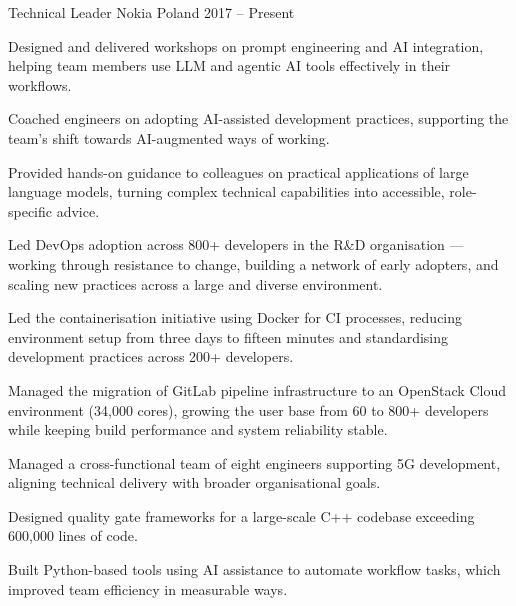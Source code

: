 
\begin{cventries}

  \cventry
    {Technical Leader} %
    {Nokia} %
    {Poland} %
    {2017 -- Present} %
    {
      \begin{cvitems}
        \item {Designed and delivered workshops on prompt engineering and AI integration, helping team members use LLM and agentic AI tools effectively in their workflows.}
        \item {Coached engineers on adopting AI-assisted development practices, supporting the team's shift towards AI-augmented ways of working.}
        \item {Provided hands-on guidance to colleagues on practical applications of large language models, turning complex technical capabilities into accessible, role-specific advice.}
      \end{cvitems}

      \begin{cvitems}
        \item {Led DevOps adoption across 800+ developers in the R&D organisation — working through resistance to change, building a network of early adopters, and scaling new practices across a large and diverse environment.}
        \item {Led the containerisation initiative using Docker for CI processes, reducing environment setup from three days to fifteen minutes and standardising development practices across 200+ developers.}
        \item {Managed the migration of GitLab pipeline infrastructure to an OpenStack Cloud environment (34,000 cores), growing the user base from 60 to 800+ developers while keeping build performance and system reliability stable.}
      \end{cvitems}

      \begin{cvitems}
        \item {Managed a cross-functional team of eight engineers supporting 5G development, aligning technical delivery with broader organisational goals.}
        \item {Designed quality gate frameworks for a large-scale C++ codebase exceeding 600,000 lines of code.}
        \item {Built Python-based tools using AI assistance to automate workflow tasks, which improved team efficiency in measurable ways.}
      \end{cvitems}
    }


\end{cventries}
